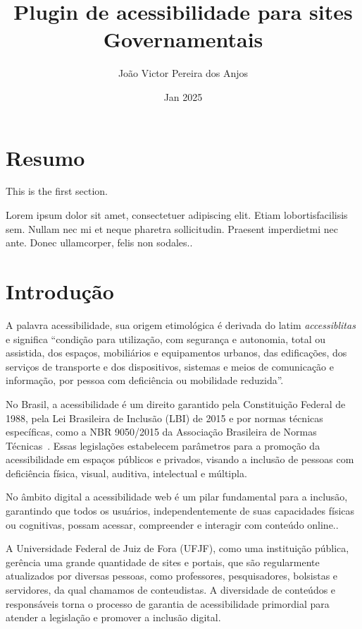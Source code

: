 \documentclass[12pt]{article}
\title{Plugin de acessibilidade para sites Governamentais}
\author{João Victor Pereira dos Anjos}
\date{Jan 2025}
\begin{document}
\maketitle
  
\tableofcontents

\section{Resumo}
   
This is the first section.
      
Lorem  ipsum  dolor  sit  amet,  consectetuer  adipiscing  
elit.   Etiam  lobortisfacilisis sem.  Nullam nec mi et 
neque pharetra sollicitudin.  Praesent imperdietmi nec ante. 
Donec ullamcorper, felis non sodales..

\section{Introdução}

A palavra acessibilidade, sua origem etimológica é derivada do latim \textit{accessiblitas} 
e significa ``condição para utilização, com segurança e autonomia, 
total ou assistida, dos espaços, mobiliários e equipamentos urbanos, das 
edificações, dos serviços de transporte e dos dispositivos, sistemas e meios de
comunicação e informação, por pessoa com deficiência ou mobilidade reduzida''\cite{Acessibilidade}.

No Brasil, a acessibilidade é um direito garantido pela Constituição 
Federal de 1988, pela Lei Brasileira de Inclusão (LBI) de 2015 \Cite{LBI}
e por normas técnicas específicas, como a NBR 9050/2015 da Associação 
Brasileira de Normas Técnicas~\cite{ABNT}. Essas legislações estabelecem 
parâmetros para a promoção da acessibilidade em espaços públicos e privados,
visando a inclusão de pessoas com deficiência física, visual, auditiva, 
intelectual e múltipla.

No âmbito digital a acessibilidade web é um pilar fundamental para a 
inclusão, garantindo que todos os usuários, independentemente de suas
capacidades físicas ou cognitivas, possam acessar, compreender e interagir com
conteúdo online.\cite{wcag22}. 

A Universidade Federal de Juiz de Fora (UFJF), como uma instituição pública,
gerência uma grande quantidade de sites e portais, que são regularmente
atualizados por diversas pessoas, como professores, pesquisadores, bolsistas e
servidores, da qual chamamos de conteudistas. A diversidade de conteúdos e
responsáveis torna o processo de garantia de acessibilidade primordial para
atender a legislação e promover a inclusão digital.
\end{document}
